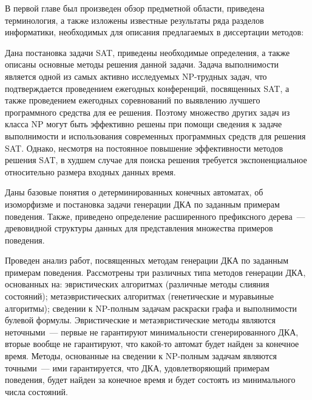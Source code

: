   


\chresults{\ref{sec:review}}

В первой главе был произведен обзор предметной области, приведена терминология, а также изложены известные результаты ряда разделов информатики, необходимых для описания предлагаемых в диссертации методов:

Дана постановка задачи SAT, приведены необходимые определения, а также описаны основные методы решения данной задачи.
Задача выполнимости является одной из самых активно исследуемых NP-трудных задач, что подтверждается проведением ежегодных конференций, посвященных SAT, а также проведением ежегодных соревнований по выявлению лучшего программного средства для ее решения.
Поэтому множество других задач из класса NP могут быть эффективно решены при помощи сведения к задаче выполнимости и использования современных программных средств для решения SAT.
Однако, несмотря на постоянное повышение эффективности методов решения SAT, в худшем случае для поиска решения требуется экспоненциальное относительно размера входных данных время.

Даны базовые понятия о детерминированных конечных автоматах, об изоморфизме и постановка задачи генерации ДКА по заданным примерам поведения.
Также, приведено определение расширенного префиксного дерева~--- древовидной структуры данных для представления множества примеров поведения.

Проведен анализ работ, посвященных методам генерации ДКА по заданным примерам поведения.
Рассмотрены три различных типа методов генерации ДКА, основанных на: эвристических алгоритмах (различные методы слияния состояний); метаэвристических алгоритмах (генетические и муравьиные алгоритмы); сведении к NP-полным задачам раскраски графа и выполнимости булевой формулы.
Эвристические и метаэвристические методы являются неточными~--- первые не гарантируют минимальности сгенерированного ДКА, вторые вообще не гарантируют, что какой-то автомат будет найден за конечное время.
Методы, основанные на сведении к NP-полным задачам являются точными~--- ими гарантируется, что ДКА, удовлетворяющий примерам поведения, будет найден за конечное время и будет состоять из минимального числа состояний.

